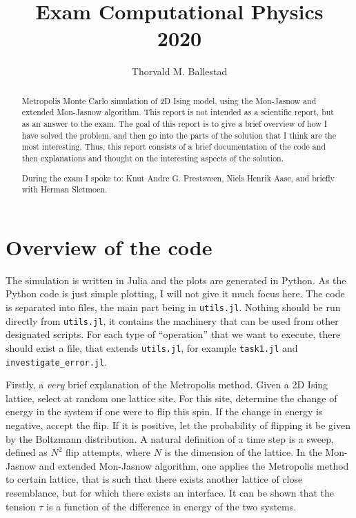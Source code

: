 \documentclass[12pt, a4paper]{article}
\title{Exam Computational Physics\\
  2020}
\author{Thorvald M. Ballestad}
\begin{document}
\maketitle
\begin{abstract}
  Metropolis Monte Carlo simulation of 2D Ising model, using the Mon-Jasnow and extended Mon-Jasnow algorithm.
  This report is not intended as a scientific report, but as an answer to the exam.
  The goal of this report is to give a brief overview of how I have solved the problem, and then go into the parts of the solution that I think are the most interesting.
  Thus, this report consists of a brief documentation of the code and then explanations and thought on the interesting aspects of the solution.


  During the exam I spoke to: Knut Andre G. Prestsveen, Niels Henrik Aase, and briefly with Herman Sletmoen.
\end{abstract}

\section{Overview of the code}
The simulation is written in Julia and the plots are generated in Python.
As the Python code is just simple plotting, I will not give it much focus here.
The code is separated into files, the main part being in \verb|utils.jl|.
Nothing should be run directly from \verb|utils.jl|, it contains the machinery that can be used from other designated scripts.
For each type of ``operation'' that we want to execute, there should exist a file, that extends \verb|utils.jl|, for example \verb|task1.jl| and \verb|investigate_error.jl|.

Firstly, a \emph{very} brief explanation of the Metropolis method.
Given a 2D Ising lattice, select at random one lattice site.
For this site, determine the change of energy in the system if one were to flip this spin.
If the change in energy is negative, accept the flip.
If it is positive, let the probability of flipping it be given by the Boltzmann distribution.
A natural definition of a time step is a sweep, defined as $N^2$ flip attempts, where $N$ is the dimension of the lattice.
In the Mon-Jasnow and extended Mon-Jasnow algorithm, one applies the Metropolis method to certain lattice, that is such that there exists another lattice of close resemblance, but for which there exists an interface.
It can be shown that the tension $\tau$ is a function of the difference in energy of the two systems.
\end{document}
